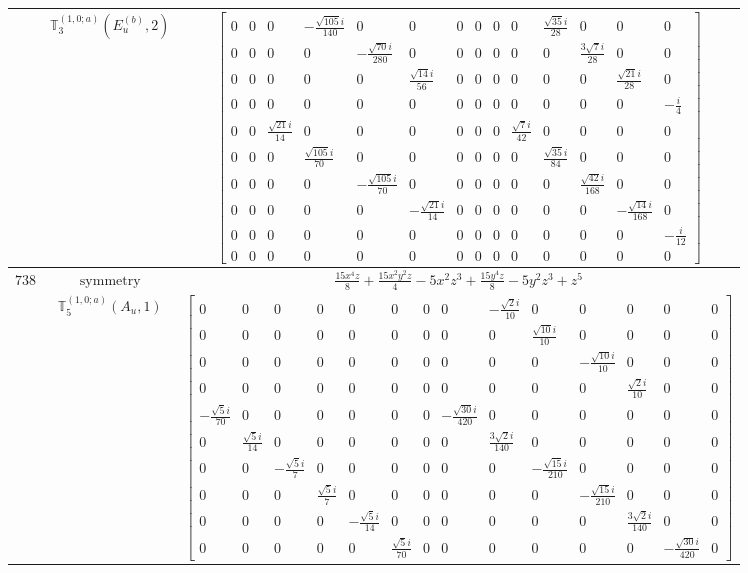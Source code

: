 \documentclass[fleqn,8pt,landscape]{jsarticle}
\begin{document}
\begin{longtable}{ccc}
$  $ & $ \mathbb{T}_{3}^{(1,0;a)}(E_{u}^{(b)},2) $ & $ \begin{bmatrix} 0 & 0 & 0 & - \frac{\sqrt{105} i}{140} & 0 & 0 & 0 & 0 & 0 & 0 & \frac{\sqrt{35} i}{28} & 0 & 0 & 0 \\ 0 & 0 & 0 & 0 & - \frac{\sqrt{70} i}{280} & 0 & 0 & 0 & 0 & 0 & 0 & \frac{3 \sqrt{7} i}{28} & 0 & 0 \\ 0 & 0 & 0 & 0 & 0 & \frac{\sqrt{14} i}{56} & 0 & 0 & 0 & 0 & 0 & 0 & \frac{\sqrt{21} i}{28} & 0 \\ 0 & 0 & 0 & 0 & 0 & 0 & 0 & 0 & 0 & 0 & 0 & 0 & 0 & - \frac{i}{4} \\ 0 & 0 & \frac{\sqrt{21} i}{14} & 0 & 0 & 0 & 0 & 0 & 0 & \frac{\sqrt{7} i}{42} & 0 & 0 & 0 & 0 \\ 0 & 0 & 0 & \frac{\sqrt{105} i}{70} & 0 & 0 & 0 & 0 & 0 & 0 & \frac{\sqrt{35} i}{84} & 0 & 0 & 0 \\ 0 & 0 & 0 & 0 & - \frac{\sqrt{105} i}{70} & 0 & 0 & 0 & 0 & 0 & 0 & \frac{\sqrt{42} i}{168} & 0 & 0 \\ 0 & 0 & 0 & 0 & 0 & - \frac{\sqrt{21} i}{14} & 0 & 0 & 0 & 0 & 0 & 0 & - \frac{\sqrt{14} i}{168} & 0 \\ 0 & 0 & 0 & 0 & 0 & 0 & 0 & 0 & 0 & 0 & 0 & 0 & 0 & - \frac{i}{12} \\ 0 & 0 & 0 & 0 & 0 & 0 & 0 & 0 & 0 & 0 & 0 & 0 & 0 & 0 \end{bmatrix} $ \\ \hline
$ 738 $ & $ \text{symmetry} $ & $ \frac{15 x^{4} z}{8} + \frac{15 x^{2} y^{2} z}{4} - 5 x^{2} z^{3} + \frac{15 y^{4} z}{8} - 5 y^{2} z^{3} + z^{5} $ \\
$  $ & $ \mathbb{T}_{5}^{(1,0;a)}(A_{u},1) $ & $ \begin{bmatrix} 0 & 0 & 0 & 0 & 0 & 0 & 0 & 0 & - \frac{\sqrt{2} i}{10} & 0 & 0 & 0 & 0 & 0 \\ 0 & 0 & 0 & 0 & 0 & 0 & 0 & 0 & 0 & \frac{\sqrt{10} i}{10} & 0 & 0 & 0 & 0 \\ 0 & 0 & 0 & 0 & 0 & 0 & 0 & 0 & 0 & 0 & - \frac{\sqrt{10} i}{10} & 0 & 0 & 0 \\ 0 & 0 & 0 & 0 & 0 & 0 & 0 & 0 & 0 & 0 & 0 & \frac{\sqrt{2} i}{10} & 0 & 0 \\ - \frac{\sqrt{5} i}{70} & 0 & 0 & 0 & 0 & 0 & 0 & - \frac{\sqrt{30} i}{420} & 0 & 0 & 0 & 0 & 0 & 0 \\ 0 & \frac{\sqrt{5} i}{14} & 0 & 0 & 0 & 0 & 0 & 0 & \frac{3 \sqrt{2} i}{140} & 0 & 0 & 0 & 0 & 0 \\ 0 & 0 & - \frac{\sqrt{5} i}{7} & 0 & 0 & 0 & 0 & 0 & 0 & - \frac{\sqrt{15} i}{210} & 0 & 0 & 0 & 0 \\ 0 & 0 & 0 & \frac{\sqrt{5} i}{7} & 0 & 0 & 0 & 0 & 0 & 0 & - \frac{\sqrt{15} i}{210} & 0 & 0 & 0 \\ 0 & 0 & 0 & 0 & - \frac{\sqrt{5} i}{14} & 0 & 0 & 0 & 0 & 0 & 0 & \frac{3 \sqrt{2} i}{140} & 0 & 0 \\ 0 & 0 & 0 & 0 & 0 & \frac{\sqrt{5} i}{70} & 0 & 0 & 0 & 0 & 0 & 0 & - \frac{\sqrt{30} i}{420} & 0 \end{bmatrix} $ \\ \hline

\end{longtable}
\end{document}
